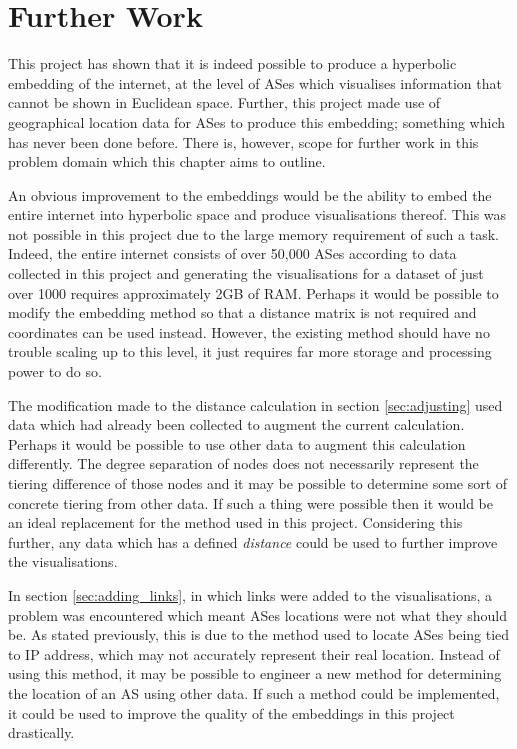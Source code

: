 \chapter{Further Work}

This project has shown that it is indeed possible to produce a hyperbolic embedding of the internet, at the level of ASes which visualises information that cannot be shown in Euclidean space. Further, this project made use of geographical location data for ASes to produce this embedding; something which has never been done before. There is, however, scope for further work in this problem domain which this chapter aims to outline. 

An obvious improvement to the embeddings would be the ability to embed the entire internet into hyperbolic space and produce visualisations thereof. This was not possible in this project due to the large memory requirement of such a task. Indeed, the entire internet consists of over 50,000 ASes according to data collected in this project and generating the visualisations for a dataset of just over 1000 requires approximately 2GB of RAM. Perhaps it would be possible to modify the embedding method so that a distance matrix is not required and coordinates can be used instead.
However, the existing method should have no trouble scaling up to this level, it just requires far more storage and processing power to do so.

The modification made to the distance calculation in section \ref{sec:adjusting} used data which had already been collected to augment the current calculation. Perhaps it would be possible to use other data to augment this calculation differently. The degree separation of nodes does not necessarily represent the tiering difference of those nodes and it may be possible to determine some sort of concrete tiering from other data. If such a thing were possible then it would be an ideal replacement for the method used in this project. Considering this further, any data which has a defined \textit{distance} could be used to further improve the visualisations.

In section \ref{sec:adding_links}, in which links were added to the visualisations, a problem was encountered which meant ASes locations were not what they should be. As stated previously, this is due to the method used to locate ASes being tied to IP address, which may not accurately represent their real location. Instead of using this method, it may be possible to engineer a new method for determining the location of an AS using other data. If such a method could be implemented, it could be used to improve the quality of the embeddings in this project drastically. 